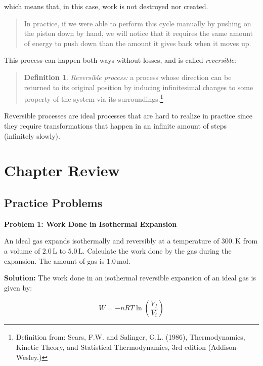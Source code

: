 \documentclass[
  9pt,
]{extbook}
\theoremstyle{definition}
\newtheorem{definition}{Definition}[chapter]
\theoremstyle{definition}
\theoremstyle{definition}
\theoremstyle{remark}
\begin{document}
which means that, in this case, work is not destroyed nor created.

\begin{quote}
In practice, if we were able to perform this cycle manually by pushing on the piston down by hand, we will notice that it requires the same amount of energy to push down than the amount it gives back when it moves up.
\end{quote}

This process can happen both ways without losses, and is called \emph{reversible}:

\begin{quote}
\begin{definition}
\protect\hypertarget{def:reversible}{}{\label{def:reversible} }\emph{Reversible process:} a process whose direction can be returned to its original position by inducing infinitesimal changes to some property of the system via its surroundings.\footnote{Definition from: Sears, F.W. and Salinger, G.L. (1986), Thermodynamics, Kinetic Theory, and Statistical Thermodynamics, 3rd edition (Addison-Wesley.)}
\end{definition}
\end{quote}

Reversible processes are ideal processes that are hard to realize in practice since they require transformations that happen in an infinite amount of steps (infinitely slowly).

\hypertarget{rev3}{%
\section{Chapter Review}\label{rev3}}

\hypertarget{exer3}{%
\subsection{Practice Problems}\label{exer3}}

\textbf{Problem 1: Work Done in Isothermal Expansion}

An ideal gas expands isothermally and reversibly at a temperature of \(300. \, \text{K}\) from a volume of \(2.0 \, \text{L}\) to \(5.0 \, \text{L}\). Calculate the work done by the gas during the expansion. The amount of gas is \(1.0 \, \text{mol}\).

\textbf{Solution:} The work done in an isothermal reversible expansion of an ideal gas is given by:

\[ W = -nRT \ln \left(\frac{V_f}{V_i}\right) \]
\end{document}
